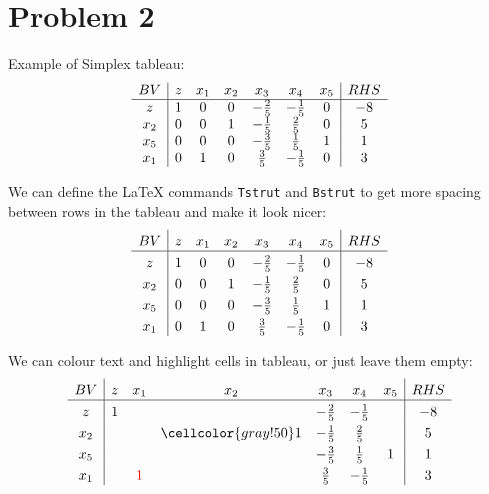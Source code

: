 \documentclass{article}
\newcommand\Tstrut{\rule{0pt}{2.6ex}}         %
\newcommand\Bstrut{\rule[-0.9ex]{0pt}{0pt}}   %
\begin{document}
\pagebreak
\section{Problem 2}

Example of Simplex tableau:
\begin{align}
    \begin{array}{c | cccccc | c}
         BV  & z & x_1 & x_2 & x_3 & x_4 & x_5 & RHS \\ 
         \hline %
         z   & 1 & 0 & 0 & -\tfrac{2}{5} & -\tfrac{1}{5} & 0 & -8 \\
         x_2 & 0 & 0 & 1 & -\tfrac{1}{5} & \tfrac{2}{5}  & 0 & 5 \\
         x_5 & 0 & 0 & 0 & -\tfrac{3}{5} & \tfrac{1}{5}  & 1 & 1 \\
         x_1 & 0 & 1 & 0 & \tfrac{3}{5}  & -\tfrac{1}{5} & 0 & 3
    \end{array}
\end{align}


We can define the \LaTeX{} commands \texttt{Tstrut} and \texttt{Bstrut} to get more spacing between rows in the tableau and make it look nicer:
\begin{align}
    \begin{array}{c | cccccc | c}
         BV  & z & x_1 & x_2 & x_3 & x_4 & x_5 & RHS \Tstrut\Bstrut \\ 
         \hline
         z   & 1 & 0 & 0 & -\tfrac{2}{5} & -\tfrac{1}{5} & 0 & -8 \Tstrut\Bstrut \\
         x_2 & 0 & 0 & 1 & -\tfrac{1}{5} & \tfrac{2}{5}  & 0 & 5  \Tstrut\Bstrut \\
         x_5 & 0 & 0 & 0 & -\tfrac{3}{5} & \tfrac{1}{5}  & 1 & 1  \Tstrut\Bstrut \\
         x_1 & 0 & 1 & 0 & \tfrac{3}{5}  & -\tfrac{1}{5} & 0 & 3  \Tstrut\Bstrut
    \end{array}
\end{align}

We can colour text and highlight cells in tableau, or just leave them empty:
\begin{align}
    \begin{array}{c | cccccc | c}
         BV  & z & x_1 & x_2 & x_3 & x_4 & x_5 & RHS \Tstrut\Bstrut \\ 
         \hline
         z   & 1 & & & -\tfrac{2}{5} & -\tfrac{1}{5} & & -8 \Tstrut\Bstrut \\
         x_2 & & & \cellcolor{gray!50}1 & -\tfrac{1}{5} & \tfrac{2}{5} & & 5 \Tstrut\Bstrut \\
         x_5 & & & & -\tfrac{3}{5} & \tfrac{1}{5}  & 1 & 1 \Tstrut\Bstrut \\
         x_1 & & \textcolor{red}{1} & & \tfrac{3}{5}  & -\tfrac{1}{5} & & 3 \Tstrut\Bstrut
    \end{array}
\end{align}
\end{document}
